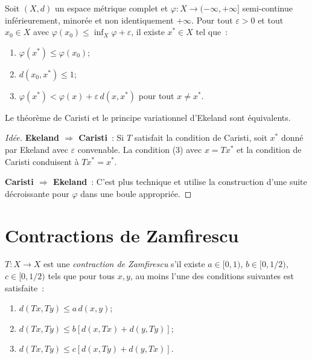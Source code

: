 \begin{theoreme}
Soit $(X, d)$ un espace m\'etrique complet et $\varphi : X \to (-\infty, +\infty]$
semi-continue inf\'erieurement, minor\'ee et non identiquement $+\infty$.
Pour tout $\varepsilon > 0$ et tout $x_0 \in X$ avec
$\varphi(x_0) \leq \inf_X \varphi + \varepsilon$, il existe $x^* \in X$ tel que~:
\begin{enumerate}
    \item $\varphi(x^*) \leq \varphi(x_0)$;
    \item $d(x_0, x^*) \leq 1$;
    \item $\varphi(x^*) < \varphi(x) + \varepsilon \, d(x, x^*)$ pour tout $x \neq x^*$.
\end{enumerate}
\end{theoreme}

\begin{proposition}
Le th\'eor\`eme de Caristi et le principe variationnel d'Ekeland sont \'equivalents.
\end{proposition}

\begin{proof}[Id\'ee]
\textbf{Ekeland $\Rightarrow$ Caristi}~: Si $T$ satisfait la condition de
Caristi, soit $x^*$ donn\'e par Ekeland avec $\varepsilon$ convenable.
La condition (3) avec $x = Tx^*$ et la condition de Caristi conduisent \`a
$Tx^* = x^*$.

\textbf{Caristi $\Rightarrow$ Ekeland}~: C'est plus technique et utilise la
construction d'une suite d\'ecroissante pour $\varphi$ dans une boule
appropri\'ee.
\end{proof}

\section{Contractions de Zamfirescu}

\begin{definition}
$T : X \to X$ est une \emph{contraction de Zamfirescu} s'il existe
$a \in [0,1)$, $b \in [0, 1/2)$, $c \in [0, 1/2)$ tels que pour tous $x, y$,
au moins l'une des conditions suivantes est satisfaite~:
\begin{enumerate}
    \item $d(Tx, Ty) \leq a \, d(x, y)$;
    \item $d(Tx, Ty) \leq b[d(x, Tx) + d(y, Ty)]$;
    \item $d(Tx, Ty) \leq c[d(x, Ty) + d(y, Tx)]$.
\end{enumerate}
\end{definition}

